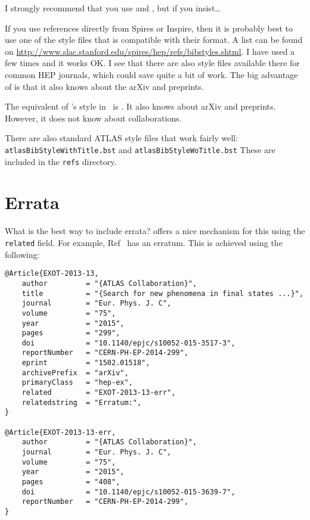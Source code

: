 I strongly recommend that you use  and , but if you insist\ldots

If you use references directly from Spires or Inspire, then it is
probably best to use one of the style files that is compatible with
their format. A list can be found on
\url{http://www.slac.stanford.edu/spires/hep/refs/bibstyles.shtml}. I
have used  a few times and it works OK. I see that
there are also style files available there for common HEP journals,
which could save quite a bit of work. The big advantage of
 is that it also knows about the arXiv and preprints.

The equivalent of 's  style in \BibTeX\ is
. It also knows about arXiv and preprints. However, it
does not know about collaborations.

There are also standard ATLAS style files that work fairly well:
\texttt{atlasBibStyleWithTitle.bst} and \texttt{atlasBibStyleWoTitle.bst}
These are included in the \texttt{refs} directory.


\section{Errata}
\label{sec:ref:errata}

What is the best way to include errata?
 offers a nice mechanism for this using the \texttt{related} field.
For example, Ref~\cite{EXOT-2013-13} has an erratum.
This is achieved using the following:
\begin{verbatim}
@Article{EXOT-2013-13,
    author         = "{ATLAS Collaboration}",
    title          = "{Search for new phenomena in final states ...}",
    journal        = "Eur. Phys. J. C",
    volume         = "75",
    year           = "2015",
    pages          = "299",
    doi            = "10.1140/epjc/s10052-015-3517-3",
    reportNumber   = "CERN-PH-EP-2014-299",
    eprint         = "1502.01518",
    archivePrefix  = "arXiv",
    primaryClass   = "hep-ex",
    related        = "EXOT-2013-13-err",
    relatedstring  = "Erratum:",
}

@Article{EXOT-2013-13-err,
    author         = "{ATLAS Collaboration}",
    journal        = "Eur. Phys. J. C",
    volume         = "75",
    year           = "2015",
    pages          = "408",
    doi            = "10.1140/epjc/s10052-015-3639-7",
    reportNumber   = "CERN-PH-EP-2014-299",
}
\end{verbatim}

